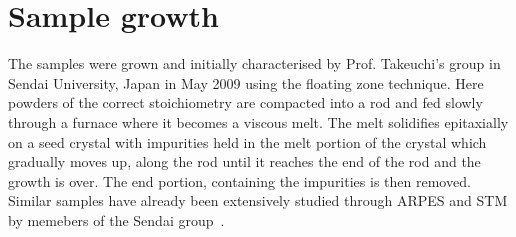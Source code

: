 
\section{Sample growth}

The samples were grown and initially characterised by Prof. Takeuchi's group in Sendai University, Japan in May 2009 using the floating zone technique. Here powders of the correct stoichiometry are compacted into a rod and fed slowly through a furnace where it becomes a viscous melt. The melt solidifies epitaxially on a seed crystal with impurities held in the melt portion of the crystal which gradually moves up, along the rod until it reaches the end of the rod and the growth is over. The end portion, containing the impurities is then removed. Similar samples have already been extensively studied through \ac{ARPES} and \ac{STM} by memebers of the Sendai group~\cite{Wise2009, Wise2008, Kondo2007, Kondo2005, Kondo2010, Kondo2009, Kondo2006, Kondo2007}.

